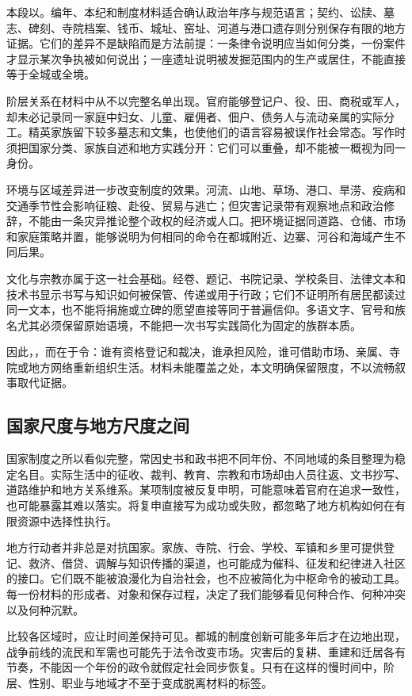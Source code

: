 本段以。编年、本纪和制度材料适合确认政治年序与规范语言；契约、讼牍、墓志、碑刻、寺院档案、钱币、城址、窑址、河道与港口遗存则分别保存有限的地方证据。它们的差异不是缺陷而是方法前提：一条律令说明应当如何分类，一份案件才显示某次争执被如何说出；一座遗址说明被发掘范围内的生产或居住，不能直接等于全城或全境。

阶层关系在材料中从不以完整名单出现。官府能够登记户、役、田、商税或军人，却未必记录同一家庭中妇女、儿童、雇佣者、佃户、债务人与流动亲属的实际分工。精英家族留下较多墓志和文集，也使他们的语言容易被误作社会常态。写作时须把国家分类、家族自述和地方实践分开：它们可以重叠，却不能被一概视为同一身份。

环境与区域差异进一步改变制度的效果。河流、山地、草场、港口、旱涝、疫病和交通季节性会影响征粮、赴役、贸易与逃亡；但灾害记录带有观察地点和政治修辞，不能由一条灾异推论整个政权的经济或人口。把环境证据同道路、仓储、市场和家庭策略并置，能够说明为何相同的命令在都城附近、边寨、河谷和海域产生不同后果。

文化与宗教亦属于这一社会基础。经卷、题记、书院记录、学校条目、法律文本和技术书显示书写与知识如何被保管、传递或用于行政；它们不证明所有居民都读过同一文本，也不能将捐施或立碑的愿望直接等同于普遍信仰。多语文字、官号和族名尤其必须保留原始语境，不能把一次书写实践简化为固定的族群本质。

因此，，而在于令：谁有资格登记和裁决，谁承担风险，谁可借助市场、亲属、寺院或地方网络重新组织生活。材料未能覆盖之处，本文明确保留限度，不以流畅叙事取代证据。

\subsection{国家尺度与地方尺度之间}

国家制度之所以看似完整，常因史书和政书把不同年份、不同地域的条目整理为稳定名目。实际生活中的征收、裁判、教育、宗教和市场却由人员往返、文书抄写、道路维护和地方关系维系。某项制度被反复申明，可能意味着官府在追求一致性，也可能暴露其难以落实。将复申直接写为成功或失败，都忽略了地方机构如何在有限资源中选择性执行。

地方行动者并非总是对抗国家。家族、寺院、行会、学校、军镇和乡里可提供登记、救济、借贷、调解与知识传播的渠道，也可能成为催科、征发和纪律进入社区的接口。它们既不能被浪漫化为自治社会，也不应被简化为中枢命令的被动工具。每一份材料的形成者、对象和保存过程，决定了我们能够看见何种合作、何种冲突以及何种沉默。

比较各区域时，应让时间差保持可见。都城的制度创新可能多年后才在边地出现，战争前线的流民和军需也可能先于法令改变市场。灾害后的复耕、重建和迁居各有节奏，不能因一个年份的政令就假定社会同步恢复。只有在这样的慢时间中，阶层、性别、职业与地域才不至于变成脱离材料的标签。

